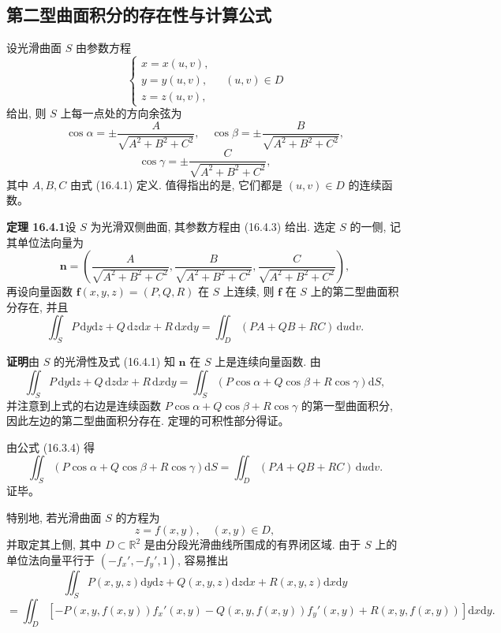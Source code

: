 \documentclass[UTF8,12pt,a4paper,fontset=fandol]{ctexart}
\begin{document}
\subsection{第二型曲面积分的存在性与计算公式}

设光滑曲面 $S$ 由参数方程
\begin{equation}
  \begin{cases}
    x=x(u,v),\\
    y=y(u,v),\\
    z=z(u,v),
  \end{cases}\quad (u,v)\in D
  \tag{16.4.3}
\end{equation}
给出, 则 $S$ 上每一点处的方向余弦为
\[
  \cos\alpha=\pm\frac{A}{\sqrt{A^2+B^2+C^2}},\quad
  \cos\beta=\pm\frac{B}{\sqrt{A^2+B^2+C^2}},
\]
\[
  \cos\gamma=\pm\frac{C}{\sqrt{A^2+B^2+C^2}},
\]
其中 $A,B,C$ 由式 (16.4.1) 定义. 值得指出的是, 它们都是 $(u,v)\in D$ 的连续函数。

\noindent\textbf{定理 16.4.1}\quad 设 $S$ 为光滑双侧曲面, 其参数方程由 (16.4.3) 给出. 选定 $S$ 的一侧, 记其单位法向量为
\[
  \boldsymbol n=\left(
    \frac{A}{\sqrt{A^2+B^2+C^2}},
    \frac{B}{\sqrt{A^2+B^2+C^2}},
    \frac{C}{\sqrt{A^2+B^2+C^2}}
  \right),
\]
再设向量函数 $\boldsymbol f(x,y,z)=(P,Q,R)$ 在 $S$ 上连续, 则 $\boldsymbol f$ 在 $S$ 上的第二型曲面积分存在, 并且
\[
  \iint_S P\,\mathrm dy\mathrm dz+Q\,\mathrm dz\mathrm dx+R\,\mathrm dx\mathrm dy
  =\iint_D(PA+QB+RC)\,\mathrm du\mathrm dv.
\]

\noindent\textbf{证明}\quad 由 $S$ 的光滑性及式 (16.4.1) 知 $\boldsymbol n$ 在 $S$ 上是连续向量函数. 由
\begin{equation}
  \iint_S P\,\mathrm dy\mathrm dz+Q\,\mathrm dz\mathrm dx+R\,\mathrm dx\mathrm dy
  =\iint_S(P\cos\alpha+Q\cos\beta+R\cos\gamma)\mathrm dS,
  \tag{16.4.4}
\end{equation}
并注意到上式的右边是连续函数 $P\cos\alpha+Q\cos\beta+R\cos\gamma$ 的第一型曲面积分, 因此左边的第二型曲面积分存在. 定理的可积性部分得证。

由公式 (16.3.4) 得
\[
  \iint_S(P\cos\alpha+Q\cos\beta+R\cos\gamma)\mathrm dS
  =\iint_D(PA+QB+RC)\,\mathrm du\mathrm dv.
\]
证毕。

特别地, 若光滑曲面 $S$ 的方程为
\[
  z=f(x,y),\quad (x,y)\in D,
\]
并取定其上侧, 其中 $D\subset\mathbb R^2$ 是由分段光滑曲线所围成的有界闭区域. 由于 $S$ 上的单位法向量平行于 $(-f_x',-f_y',1)$, 容易推出
\[
  \iint_S P(x,y,z)\mathrm dy\mathrm dz+Q(x,y,z)\mathrm dz\mathrm dx+R(x,y,z)\mathrm dx\mathrm dy
\]
\[
  =\iint_D[-P(x,y,f(x,y))f_x'(x,y)-Q(x,y,f(x,y))f_y'(x,y)
  +R(x,y,f(x,y))]\mathrm dx\mathrm dy.
\]
\end{document}
